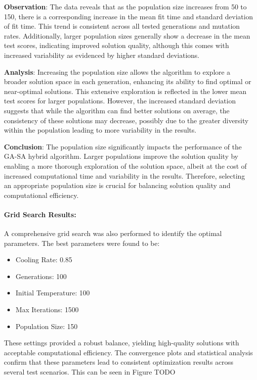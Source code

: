 \documentclass[
]{article}
\begin{document}
    \textbf{Observation}: The data reveals that as the population size increases from 50 to 150, there is a corresponding increase in the mean fit time and standard deviation of fit time. This trend is consistent across all tested generations and mutation rates. Additionally, larger population sizes generally show a decrease in the mean test scores, indicating improved solution quality, although this comes with increased variability as evidenced by higher standard deviations.

    \textbf{Analysis}: Increasing the population size allows the algorithm to explore a broader solution space in each generation, enhancing its ability to find optimal or near-optimal solutions. This extensive exploration is reflected in the lower mean test scores for larger populations. However, the increased standard deviation suggests that while the algorithm can find better solutions on average, the consistency of these solutions may decrease, possibly due to the greater diversity within the population leading to more variability in the results.

    \textbf{Conclusion}: The population size significantly impacts the performance of the GA-SA hybrid algorithm. Larger populations improve the solution quality by enabling a more thorough exploration of the solution space, albeit at the cost of increased computational time and variability in the results. Therefore, selecting an appropriate population size is crucial for balancing solution quality and computational efficiency.

    \paragraph{Grid Search Results:}
    A comprehensive grid search was also performed to identify the optimal parameters.
    The best parameters were found to be:
    \begin{itemize}
        \item Cooling Rate: 0.85
        \item Generations: 100
        \item Initial Temperature: 100
        \item Max Iterations: 1500
        \item Population Size: 150
    \end{itemize}
    These settings provided a robust balance, yielding high-quality solutions with acceptable computational efficiency. The convergence plots and statistical analysis confirm that these parameters lead to consistent optimization results across several test scenarios. This can be seen in Figure TODO
\end{document}
